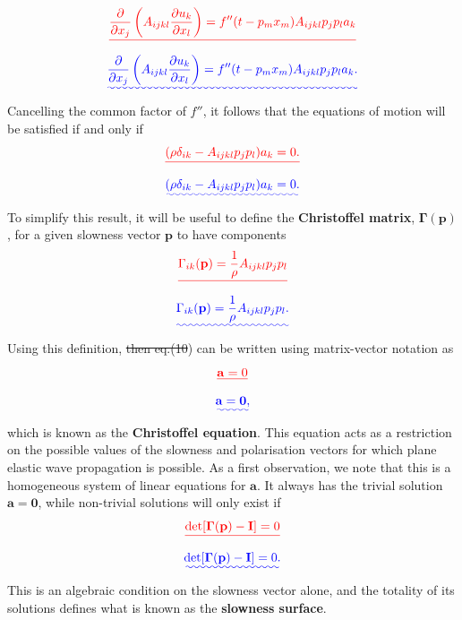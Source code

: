 \documentclass [a4paper,12pt]{paper}
\providecommand{\DIFadd}[1]{{\protect\color{blue}\uwave{#1}}} %
\providecommand{\DIFdel}[1]{{\protect\color{red}\sout{#1}}}                      %
\providecommand{\DIFaddbegin}{} %
\providecommand{\DIFaddend}{} %
\providecommand{\DIFdelbegin}{} %
\providecommand{\DIFdelend}{} %
\begin{document}
\DIFdelbegin \begin{displaymath}
\DIFdel{\frac{\partial}{\partial x_{j}}\left(A_{ijkl}\frac{\partial u_{k}}{\partial x_{l}}\right)=f''(t-p_{m}x_{m})A_{ijkl}p_{j}p_{l}a_{k}
}\end{displaymath}%
\DIFdelend \DIFaddbegin \begin{equation}
\DIFadd{\frac{\partial}{\partial x_{j}}\left(A_{ijkl}\frac{\partial u_{k}}{\partial x_{l}}\right)=f''(t-p_{m}x_{m})A_{ijkl}p_{j}p_{l}a_{k}.
\label{eq:9}
}\end{equation}\DIFaddend 
Cancelling the common factor of $f''$, it follows that the equations of motion will be satisfied if and only if
\DIFdelbegin \begin{displaymath}
\DIFdel{(\rho\delta_{ik}-A_{ijkl}p_{j}p_{l})a_{k}=0.
}\end{displaymath}%
\DIFdelend \DIFaddbegin \begin{equation}
\DIFadd{(\rho\delta_{ik}-A_{ijkl}p_{j}p_{l})a_{k}=0.
\label{eq:10}
}\end{equation}\DIFaddend 
To simplify this result, it will be useful to define the \textbf{Christoffel matrix}, $\bm{\Gamma}(\mathbf{p})$, 
for a given slowness vector $\mathbf{p}$ to have components
\DIFdelbegin \begin{displaymath}
\DIFdel{\Gamma_{ik}(\mathbf{p})=\frac{1}{\rho}A_{ijkl}p_{j}p_{l}
}\end{displaymath}%
\DIFdelend \DIFaddbegin \begin{equation}
\DIFadd{\Gamma_{ik}(\mathbf{p})=\frac{1}{\rho}A_{ijkl}p_{j}p_{l}.
\label{eq:11}
}\end{equation}\DIFaddend 
Using this definition, \DIFdelbegin \DIFdel{then eq.(10}\DIFdelend \DIFaddbegin \DIFadd{eq.~(\ref{eq:10}}\DIFaddend ) can be written using matrix-vector notation as
\DIFdelbegin \begin{displaymath}
[\DIFdel{\bm{\Gamma}(\mathbf{p})-\mathbf{I}}]\DIFdel{\mathbf{a}=0
}\end{displaymath}%
\DIFdelend \DIFaddbegin \begin{equation}
[\DIFadd{\bm{\Gamma}(\mathbf{p})-\mathbf{I}}]\DIFadd{\mathbf{a}=\mathbf{0},
\label{eq:12}
}\end{equation}\DIFaddend 
which is known as the \textbf{Christoffel equation}. This equation acts as a restriction on the possible values 
of the slowness and polarisation vectors for which plane elastic wave propagation is possible.
As a first observation, we note that this is a homogeneous system of linear equations for $\mathbf{a}$.
It always has the trivial solution $\mathbf{a}=\mathbf{0}$, while non-trivial solutions will only exist if
\DIFdelbegin \begin{displaymath}
\DIFdel{\det[\bm{\Gamma}(\mathbf{p})-\mathbf{I}]=0
}\end{displaymath}%
\DIFdelend \DIFaddbegin \begin{equation}
\DIFadd{\det[\bm{\Gamma}(\mathbf{p})-\mathbf{I}]=0.
\label{eq:13}
}\end{equation}\DIFaddend 
This is an algebraic condition on the slowness vector alone, and the totality of its solutions defines what is known as the \textbf{slowness surface}.
\end{document}
